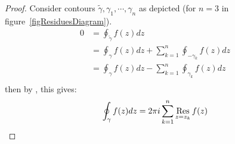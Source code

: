 \documentclass[../Main.tex]{subfiles}
\begin{document}
\begin{proof}
    Consider contours $\tilde{\gamma}, \gamma_1, \cdots, \gamma_n$ as depicted (for $n = 3$ in figure~\ref{figResiduesDiagram}).
    \begin{align*}
        0 &= \oint_{\tilde{\gamma}} f(z) dz \\
        &= \oint_{\gamma} f(z) dz + \sum_{k=1}^{n} \oint_{- \gamma_k} f(z) dz \\
        &= \oint_{\gamma} f(z) dz - \sum_{k=1}^{n} \oint_{\gamma_k} f(z) dz \\
    \end{align*}
    then by , this gives:
    \begin{equation*}
        \oint_{\gamma} f(z) dz = 2\pi i \sum_{k=1}^{n} \operatorname*{Res}_{z = z_k} f(z)
    \end{equation*}
\end{proof}
\end{document}
